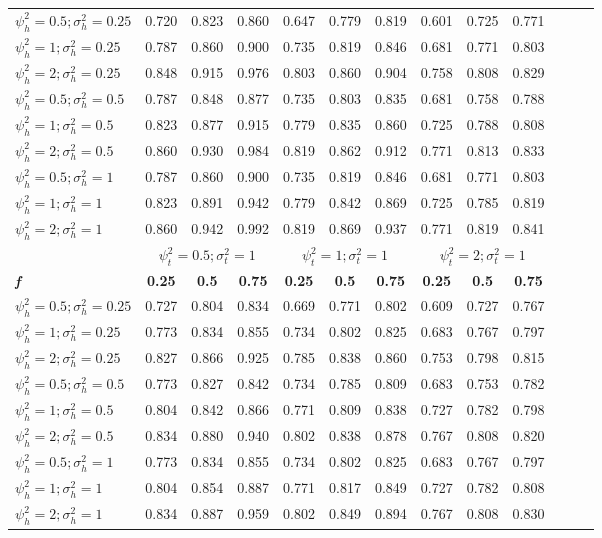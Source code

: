 \begin{table}[ht!]
{\begin{tabular}{l c c c c c c c c c c c c}
\hline
$\psi_h^2 = 0.5; \sigma_h^2 = 0.25$ & 0.720 & 0.823 & 0.860 & 0.647 & 0.779 & 0.819 & 0.601 & 0.725 & 0.771 \\
$\psi_h^2 = 1; \sigma_h^2 = 0.25$ & 0.787 & 0.860 & 0.900 & 0.735 & 0.819 & 0.846 & 0.681 & 0.771 & 0.803 \\
$\psi_h^2 = 2; \sigma_h^2 = 0.25$ & 0.848 & 0.915 & 0.976 & 0.803 & 0.860 & 0.904 & 0.758 & 0.808 & 0.829 \\
$\psi_h^2 = 0.5; \sigma_h^2 = 0.5$ & 0.787 & 0.848 & 0.877 & 0.735 & 0.803 & 0.835 & 0.681 & 0.758 & 0.788 \\
$\psi_h^2 = 1; \sigma_h^2 = 0.5$ & 0.823 & 0.877 & 0.915 & 0.779 & 0.835 & 0.860 & 0.725 & 0.788 & 0.808 \\
$\psi_h^2 = 2; \sigma_h^2 = 0.5$ & 0.860 & 0.930 & 0.984 & 0.819 & 0.862 & 0.912 & 0.771 & 0.813 & 0.833 \\
$\psi_h^2 = 0.5; \sigma_h^2 = 1$ & 0.787 & 0.860 & 0.900 & 0.735 & 0.819 & 0.846 & 0.681 & 0.771 & 0.803 \\
$\psi_h^2 = 1; \sigma_h^2 = 1$ & 0.823 & 0.891 & 0.942 & 0.779 & 0.842 & 0.869 & 0.725 & 0.785 & 0.819 \\
$\psi_h^2 = 2; \sigma_h^2 = 1$ & 0.860 & 0.942 & 0.992 & 0.819 & 0.869 & 0.937 & 0.771 & 0.819 & 0.841 \\
\hline 
 & \multicolumn{3}{c}{$\psi_t^2 = 0.5; \sigma_t^2 = 1$} & \multicolumn{3}{c}{$\psi_t^2 = 1; \sigma_t^2 = 1$} & \multicolumn{3}{c}{$\psi_t^2 = 2; \sigma_t^2 = 1$} \\
\cline{2-10}
\textbf{\textit{f}} & \textbf{0.25} & \textbf{0.5} & \textbf{0.75} & \textbf{0.25} & \textbf{0.5} & \textbf{0.75} & \textbf{0.25} & \textbf{0.5} & \textbf{0.75} \\
\hline
$\psi_h^2 = 0.5; \sigma_h^2 = 0.25$ & 0.727 & 0.804 & 0.834 & 0.669 & 0.771 & 0.802 & 0.609 & 0.727 & 0.767 \\
$\psi_h^2 = 1; \sigma_h^2 = 0.25$ & 0.773 & 0.834 & 0.855 & 0.734 & 0.802 & 0.825 & 0.683 & 0.767 & 0.797 \\
$\psi_h^2 = 2; \sigma_h^2 = 0.25$ & 0.827 & 0.866 & 0.925 & 0.785 & 0.838 & 0.860 & 0.753 & 0.798 & 0.815 \\
$\psi_h^2 = 0.5; \sigma_h^2 = 0.5$ & 0.773 & 0.827 & 0.842 & 0.734 & 0.785 & 0.809 & 0.683 & 0.753 & 0.782 \\
$\psi_h^2 = 1; \sigma_h^2 = 0.5$ & 0.804 & 0.842 & 0.866 & 0.771 & 0.809 & 0.838 & 0.727 & 0.782 & 0.798 \\
$\psi_h^2 = 2; \sigma_h^2 = 0.5$ & 0.834 & 0.880 & 0.940 & 0.802 & 0.838 & 0.878 & 0.767 & 0.808 & 0.820 \\
$\psi_h^2 = 0.5; \sigma_h^2 = 1$ & 0.773 & 0.834 & 0.855 & 0.734 & 0.802 & 0.825 & 0.683 & 0.767 & 0.797 \\
$\psi_h^2 = 1; \sigma_h^2 = 1$ & 0.804 & 0.854 & 0.887 & 0.771 & 0.817 & 0.849 & 0.727 & 0.782 & 0.808 \\
$\psi_h^2 = 2; \sigma_h^2 = 1$ & 0.834 & 0.887 & 0.959 & 0.802 & 0.849 & 0.894 & 0.767 & 0.808 & 0.830 \\
\bottomrule
\end{tabular}}
\end{table}


